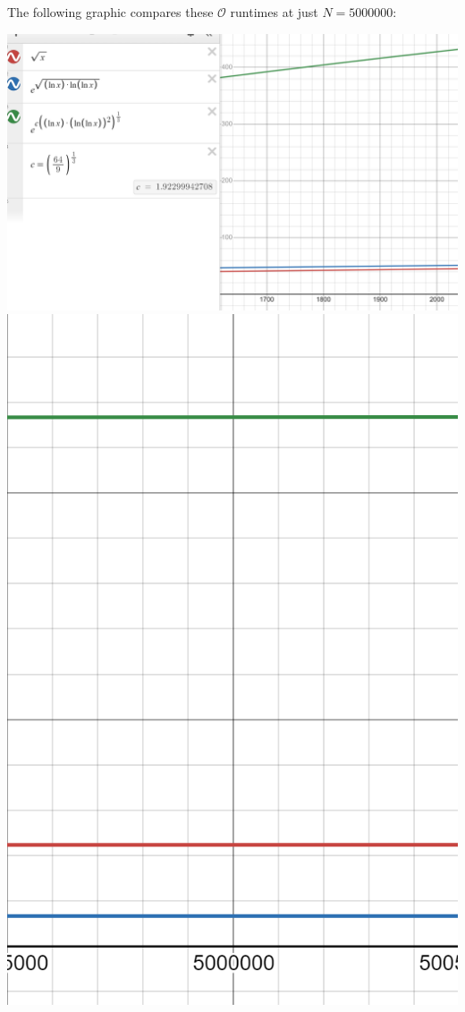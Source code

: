 \documentclass[11pt,reqno]{amsart}
\theoremstyle{definition}
\begin{document}
The following graphic compares these $\mathcal{O}$ runtimes at just $N=5000000$:

\begin{center}
\includegraphics[scale=0.25]{runtimegraphic600.png}
\includegraphics[scale=0.3]{runtimegraphic5000000.png}
\end{center}
\end{document}
